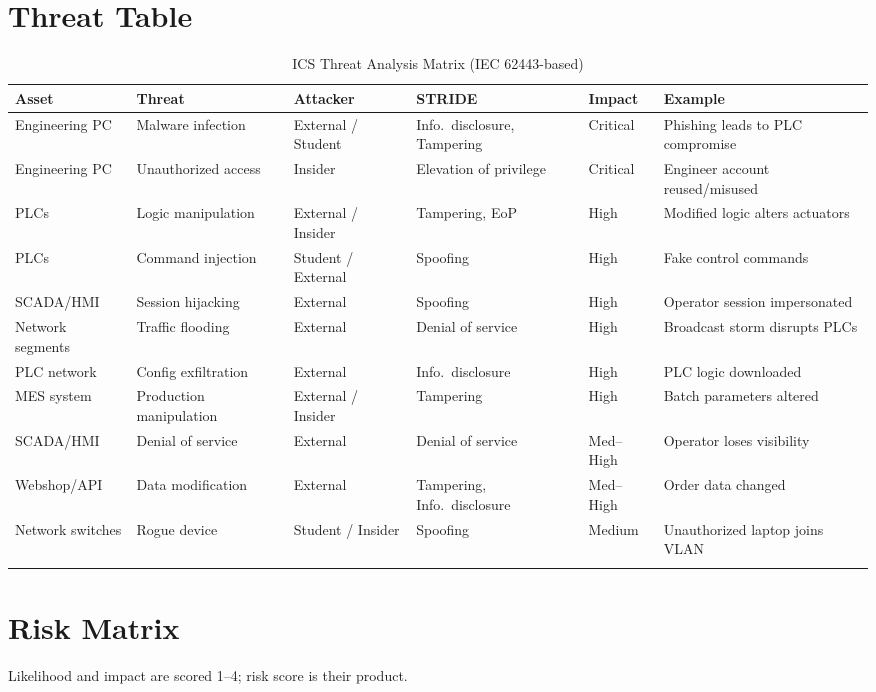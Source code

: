 \documentclass{report}
\begin{document}
\section{Threat Table}

{\small
\setlength{\tabcolsep}{4pt}
\begin{longtable}{L{2.2cm} L{2.6cm} L{2.2cm} L{2.8cm} L{1.4cm} L{2.2cm}}
\toprule
\textbf{Asset} & \textbf{Threat} & \textbf{Attacker} & \textbf{STRIDE} & \textbf{Impact} & \textbf{Example} \\
\midrule \endhead
Engineering PC & Malware infection & External / Student & Info.\ disclosure, Tampering & Critical & Phishing leads to PLC compromise \\
Engineering PC & Unauthorized access & Insider & Elevation of privilege & Critical & Engineer account reused/misused \\
PLCs & Logic manipulation & External / Insider & Tampering, EoP & High & Modified logic alters actuators \\
PLCs & Command injection & Student / External & Spoofing & High & Fake control commands \\
SCADA/HMI & Session hijacking & External & Spoofing & High & Operator session impersonated \\
Network segments & Traffic flooding & External & Denial of service & High & Broadcast storm disrupts PLCs \\
PLC network & Config exfiltration & External & Info.\ disclosure & High & PLC logic downloaded \\
MES system & Production manipulation & External / Insider & Tampering & High & Batch parameters altered \\
SCADA/HMI & Denial of service & External & Denial of service & Med--High & Operator loses visibility \\
Webshop/API & Data modification & External & Tampering, Info.\ disclosure & Med--High & Order data changed \\
Network switches & Rogue device & Student / Insider & Spoofing & Medium & Unauthorized laptop joins VLAN \\
\bottomrule
\caption{ICS Threat Analysis Matrix (IEC 62443-based)}
\end{longtable}
}

\section{Risk Matrix}
Likelihood and impact are scored 1--4; risk score is their product.
\end{document}
